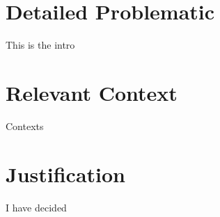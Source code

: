 \section{Detailed Problematic}\label{sec:detailed-problematic}
This is the intro
\section{Relevant Context}\label{sec:relevant-context}
Contexts
\section{Justification}\label{sec:justification}
I have decided